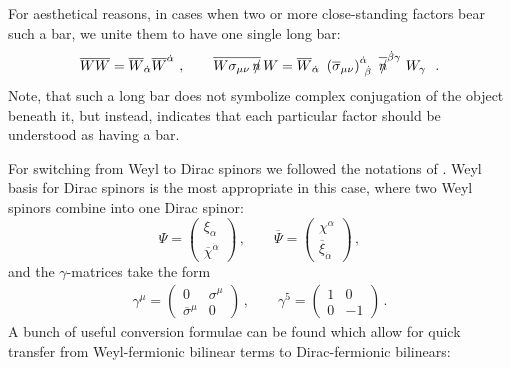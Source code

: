 \documentclass[paper,12pt]{revtex4}
\newcommand{\slashed}[1]{\hbox{{$#1$}\llap{$/$}}}
\begin{document}
	For aesthetical reasons, in cases when two or more close-standing
	factors bear such a bar, we unite them to have one single 
	long bar:
\[
	\overline{W W} = \overline{W}_{\dot\alpha}
			 \overline{W}^{\dot\alpha}~,
	\qquad
	\overline{W \sigma_{\mu\nu}\, \slashed{n}}\, W = 
		\overline{W}_{\dot\alpha}\,\, 
		\left(\overline{\sigma}_{\mu\nu}\right)
				^{\dot\alpha}_{~\dot\beta}\,\,
		\overline{\slashed{n}}^{\dot\beta \gamma}\,\,
		W_\gamma~
	~.
\]
	Note, that such a long bar does not symbolize complex conjugation
	of the object beneath it, but instead, indicates that each particular
	factor should be understood as having a bar.

	For switching from Weyl to Dirac spinors we followed the notations of 
\cite{Martin:1997ns}.
	Weyl basis for Dirac spinors is the most appropriate in this case,
	where two Weyl spinors combine into one Dirac spinor:
\[
	\Psi = 
		\left (
		\begin{array}{c}
	  		\xi_\alpha \\
			\overline{\chi}^{\dot\alpha}
		\end{array}
		\right )\,,
	\qquad
	\overline{\Psi} = 
		\left (
		\begin{array}{c}
	  		\chi^\alpha \\
			\overline{\xi}_{\dot\alpha}
		\end{array}
		\right )\,,
\]
	and the $ \gamma $-matrices take the form
\begin{eqnarray*}
	\gamma^\mu = 
			\left ( 
		\begin{array}{cc}
			0                    &    \sigma^\mu \\
                     \overline{\sigma}^\mu   &         0    
		\end{array}
			\right )\,,
	\qquad
	\gamma^5 = 
			\left ( 
		\begin{array}{cc}
			1      &         0  \\
                        0      &        -1    
		\end{array}
			\right )\,.
\end{eqnarray*}
	A bunch of useful conversion formulae can be found
\cite{Martin:1997ns}
	which allow for quick transfer from Weyl-fermionic
	bilinear terms to Dirac-fermionic bilinears:
\end{document}

